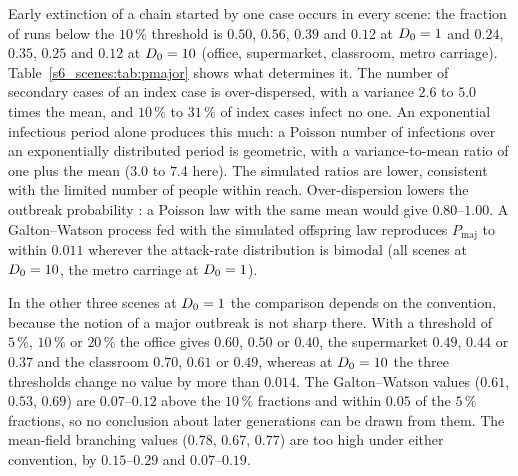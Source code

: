 Early extinction of a chain started by one case occurs in every scene: the fraction of runs below the
$10\,\%$ threshold is $0.50$, $0.56$, $0.39$ and $0.12$ at $D_0=1$ and $0.24$, $0.35$, $0.25$ and $0.12$ at
$D_0=10$ (office, supermarket, classroom, metro carriage).
Table~\ref{s6_scenes:tab:pmajor} shows what determines it. The number of secondary cases of an index case is
over-dispersed, with a variance $2.6$ to $5.0$ times the mean, and $10\,\%$ to $31\,\%$ of index cases infect no one.
An exponential infectious period alone produces this much: a Poisson number of infections over an exponentially
distributed period is geometric, with a variance-to-mean ratio of one plus the mean ($3.0$ to $7.4$ here). The
simulated ratios are lower, consistent with the limited number of people within reach.
Over-dispersion lowers the outbreak probability \citep{lloydsmith2005superspreading}: a Poisson law with the same
mean would give $0.80$--$1.00$. A Galton--Watson process fed with the simulated offspring law reproduces
$P_{\mathrm{maj}}$ to within $0.011$ wherever the attack-rate distribution is bimodal (all scenes at $D_0=10$, the
metro carriage at $D_0=1$).

In the other three scenes at $D_0=1$ the comparison depends on the convention, because the notion of a major
outbreak is not sharp there. With a threshold of $5\,\%$, $10\,\%$ or $20\,\%$ the office gives $0.60$, $0.50$ or
$0.40$, the supermarket $0.49$, $0.44$ or $0.37$ and the classroom $0.70$, $0.61$ or $0.49$, whereas at $D_0=10$
the three thresholds change no value by more than $0.014$.
The Galton--Watson values ($0.61$, $0.53$, $0.69$) are $0.07$--$0.12$ above the $10\,\%$ fractions and within
$0.05$ of the $5\,\%$ fractions, so no conclusion about later generations can be drawn from them. The mean-field
branching values ($0.78$, $0.67$, $0.77$) are too high under either convention, by $0.15$--$0.29$ and
$0.07$--$0.19$.

